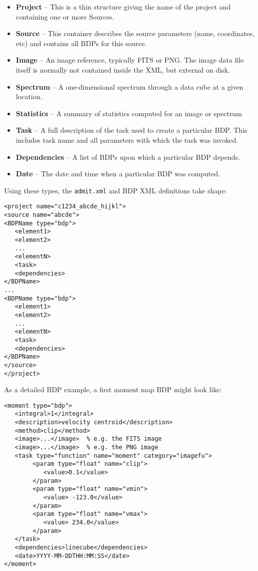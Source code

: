 \documentclass{article}
\begin{document}
\begin{itemize}
\item {\bf Project} -- This is a thin structure giving the name of the project and containing one or more Sources.
\item {\bf Source}  -- This container describes the source parameters (name, coordinates, etc) and contains all BDPs for this source.
\item {\bf Image}  -- An image reference, typically FITS or PNG. The image data file itself is normally not contained inside the XML, but external on disk.
\item {\bf Spectrum} -- A one-dimensional spectrum through a data cube at a given location.
\item {\bf Statistics}  -- A summary of statistics computed for an image or spectrum
\item {\bf Task} -- A full description of the task used to create a particular BDP.  This includes task name and all parameters with which the task was invoked.
\item {\bf Dependencies} -- A list of BDPs upon which a particular BDP depends. 
\item {\bf Date} -- The date and time when a particular BDP was computed.
\end{itemize}

\noindent Using these types, the {\tt admit.xml} and BDP XML definitions take shape:

\footnotesize
\begin{verbatim}
<project name="c1234_abcde_hijkl">
<source name="abcde">
<BDPName type="bdp">
   <element1>
   <element2>
   ...
   <elementN>
   <task>
   <dependencies>
</BDPName>
...
<BDPName type="bdp">
   <element1>
   <element2>
   ...
   <elementN>
   <task>
   <dependencies>
</BDPName>
</source>
</project>

\end{verbatim}
\normalsize

\noindent As a detailed BDP example, a first moment map BDP might look like:

\footnotesize
\begin{verbatim}
<moment type="bdp">
   <integral>1</integral>
   <description>velocity centroid</description>
   <method>clip</method>
   <image>...</image>  % e.g. the FITS image
   <image>...</image>  % e.g. the PNG image
   <task type="function" name="moment" category="imagefu">
        <param type="float" name="clip">
           <value>0.1</value>
        </param>
        <param type="float" name="vmin">
           <value> -123.0</value>
        </param>
        <param type="float" name="vmax">
           <value> 234.0</value>
        </param>
   </task>
   <dependencies>linecube</dependencies>
   <date>YYYY-MM-DDTHH:MM:SS</date>
</moment>
\end{verbatim}
\normalsize
\end{document}
